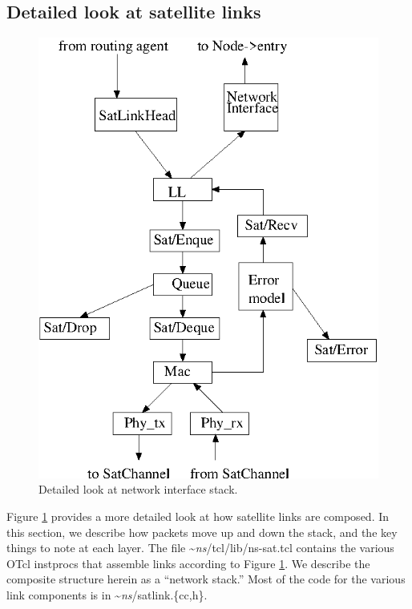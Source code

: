 \subsection{Detailed look at satellite links}
\begin{figure}
    \centerline{\includegraphics{sat-stack}}
    \caption{Detailed look at network interface stack.}
    \label{fig:sat-stack}
\end{figure}

Figure \ref{fig:sat-stack} provides a more detailed look at how satellite links
are composed.  In this section, we describe how packets move up and down
the stack, and the key things to note at each layer.  The file 
\textasciitilde\emph{ns}/{tcl/lib/ns-sat.tcl} contains the various OTcl instprocs that assemble
links according to Figure \ref{fig:sat-stack}.  We describe the composite
structure herein as a ``network stack.''  Most of the code for the
various link components is in \textasciitilde\emph{ns}/{satlink.\{cc,h\}}.

